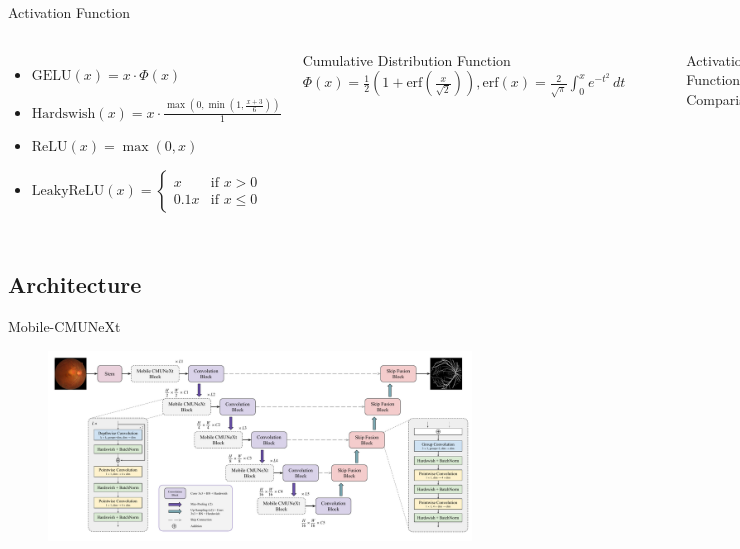 \documentclass[aspectratio=169,xcolor=dvipsnames]{beamer}
\newcommand{\vtab}{\vspace{0.3cm}}
\begin{document}
\begin{frame}{Activation Function}
    \begin{columns}
    \begin{itemize}
        \item $ \text{GELU}(x) = x \cdot \Phi(x) $
        \vtab
        \item $ \text{Hardswish}(x) = x \cdot \frac{\max(0, \min(1, \frac{x + 3}{6}) )}{1} $
        \vtab
        \item $ \text{ReLU}(x) = \max(0, x) $
        \vtab
        \item $\text{LeakyReLU}(x) = \begin{cases} x & \text{if } x > 0 \\ 0.1x & \text{if } x \leq 0 \end{cases}$
    \end{itemize}

    \begin{block}{Cumulative Distribution Function}
        \centering
        $ \Phi(x) = \frac{1}{2} \left( 1 + \text{erf}\left(\frac{x}{\sqrt{2}}\right) \right), \text{erf}(x) = \frac{2}{\sqrt{\pi}} \int_0^x e^{-t^2} \, dt $
    \end{block}

        \begin{figure}
            \fittowidth{}
            \caption{Activation Functions Comparison}
        \end{figure}
    \end{columns}
\end{frame}


\subsection{Architecture}

\begin{frame}{Mobile-CMUNeXt}
    \begin{figure}
        \includegraphics[width=\textwidth]{figures/Network Architecture.pdf}
    \end{figure}
\end{frame}
\end{document}
